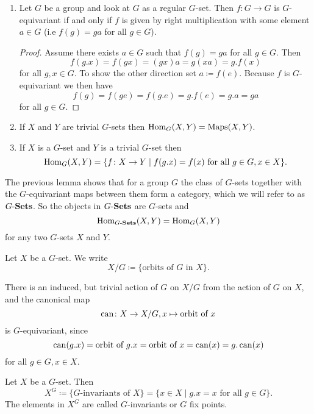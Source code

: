 \begin{expls}
 \begin{enumerate}
  \item
   Let $G$ be a group and look at $G$ as a regular $G$-set. Then $f \colon G \to G$ is $G$-equivariant if and only if $f$ is given by right multiplication with some element $a \in G$ (i.e $f(g) = ga$ for all $g \in G$).
   \begin{proof}
    Assume there exists $a \in G$ such that $f(g) = ga$ for all $g \in G$. Then
    \[
     f(g.x) = f(gx) = (gx)a = g(xa) = g.f(x)
    \]
    for all $g, x \in G$. To show the other direction set $a \coloneqq f(e)$. Because $f$ is $G$-equivariant we then have
    \[
     f(g) = f(ge) = f(g.e) = g.f(e) = g.a = ga
    \]
    for all $g \in G$.
   \end{proof}
  \item
   If $X$ and $Y$ are trivial $G$-sets then $\operatorname{Hom}_G(X,Y) = \operatorname{Maps}(X,Y)$.
  \item
   If $X$ is a $G$-set and $Y$ is a trivial $G$-set then
   \[
    \operatorname{Hom}_G(X,Y) = \{f \colon X \to Y \mid f(g.x) = f(x) \text{ for all } g \in G, x \in X\}.
   \]
 \end{enumerate}
\end{expls}


The previous lemma shows that for a group $G$ the class of $G$-sets together with the $G$-equivariant maps between them form a category, which we will refer to as $G\text{-}\mathbf{Sets}$. So the objects in $G\text{-}\mathbf{Sets}$ are $G$-sets and
\[
 \operatorname{Hom}_{G\text{-}\mathbf{Sets}}(X,Y) = \operatorname{Hom}_G(X,Y)
\]
for any two $G$-sets $X$ and $Y$.


\begin{defi}
 Let $X$ be a $G$-set. We write
 \[
  X/G \coloneqq \{\text{orbits of $G$ in $X$}\}.
 \]
\end{defi}


\begin{note}
 There is an induced, but trivial action of $G$ on $X/G$ from the action of $G$ on $X$, and the canonical map
 \[
  \operatorname{can} \colon X \to X/G, x \mapsto \text{orbit of } x
 \]
 is $G$-equivariant, since
 \[
  \operatorname{can}(g.x) = \text{orbit of $g.x$} = \text{orbit of $x$} = \operatorname{can}(x) = g.\operatorname{can}(x)
 \]
 for all $g \in G, x \in X$.
\end{note}


\begin{defi}
 Let $X$ be a $G$-set. Then
 \[
  X^G \coloneqq \{\text{$G$-invariants of $X$}\} = \{x \in X \mid g.x = x \text{ for all } g \in G\}.
 \]
 The elements in $X^G$ are called $G$-invariants or $G$ fix points.
\end{defi}



